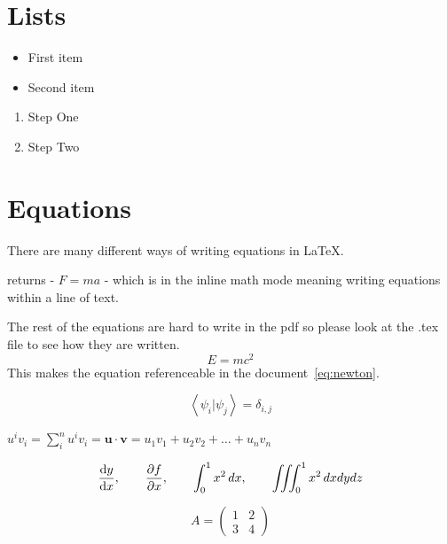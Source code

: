 \documentclass[a4paper,11pt]{article}
\begin{document}
    \section{Lists} %
        \begin{itemize}
        \item First item
        \item Second item
        \end{itemize}

        \begin{enumerate}
        \item Step One
        \item Step Two
        \end{enumerate}


    \section{Equations}
        There are many different ways of writing equations in LaTeX.

         returns - $F=ma$ - which is in the inline math mode meaning writing equations within a line of text.

        The rest of the equations are hard to write in the pdf so please look at the .tex file to see how they are written.
        \begin{equation}
        E = mc^2
        \label{eq:newton}
        \end{equation}
        This makes the equation referenceable in the document~\ref{eq:newton}.

        \[
        \left\langle \psi_i |\psi_j \right\rangle = \delta_{i,j}
        \]

        \(
        u^i v_i = \sum_i^n u^i v_i = \mathbf{u} \cdot \mathbf{v} = u_1 v_1 + u_2 v_2 + 
        \dots + u_n v_n
        \)
        
        \[
        \dv{y}{x},\qquad %
        \pdv{f}{x},\qquad %
        \int_0^1 x^2\,dx,\qquad
        \iiint_0^1 x^2\,dxdydz
        \]

        \[
        A=\begin{pmatrix}
        1 & 2\\
        3 & 4
        \end{pmatrix}
        \]
\end{document}
